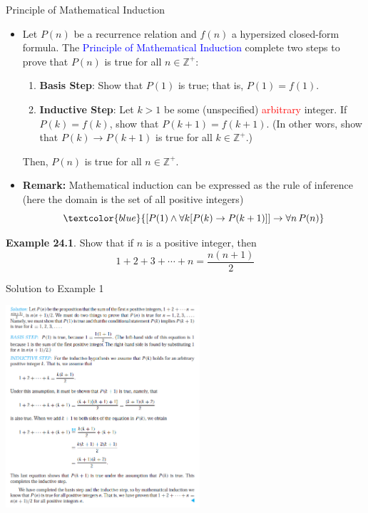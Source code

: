 \documentclass[aspectratio=169]{beamer}
\providecommand{\Blue}[1]{\textcolor{blue}{#1}}
\providecommand{\Red}[1]{\textcolor{red}{#1}}
\begin{document}
\begin{frame}[plain]{Principle of Mathematical Induction}
 \begin{itemize}
  \item Let $P(n)$ be a recurrence relation and $f(n)$ a hypersized closed-form formula. 
     The \Blue{Principle of Mathematical Induction} complete two steps to prove that $P(n)$
    is true for all $n\in\mathbb{Z}^+$: \pause 
   \begin{enumerate}
     \item {\bf Basis Step}: Show that $P(1)$ is true; that is, $P(1) = f(1)$.\pause 
     \item {\bf Inductive Step}: Let $k>1$ be some (unspecified) \Red{arbitrary}  integer.
        If $P(k) = f(k)$,  show that $P(k+1) = f(k+1)$.
        (In other wors, show that $P(k)\rightarrow P(k+1)$ is true for all $k\in \mathbb{Z}^+$.)\pause 
   \end{enumerate}
   Then, $P(n)$ is true for all $n\in \mathbb{Z}^+$.\pause 
    \item {\bf Remark:} Mathematical induction can be expressed as the rule of inference
   (here the domain is the set of all positive integers)
  \[ \Blue{ [P(1)\wedge \forall k [P(k)\rightarrow P(k+1)]] \rightarrow \forall n\, P(n) } \] 
 \end{itemize} 

\end{frame}

\begin{frame}[plain]{}

  {\bf Example 24.1}. Show that if $n$ is a positive integer, then
   \[ 1+2+3+ \cdots + n = \frac{n(n+1)}{2} \]
  
   \vspace{1.4in}

\end{frame}


\begin{frame}[plain]{Solution to Example 1}
 \begin{center}
  \includegraphics[height=7.5cm]{./img/lecture24-fig2.png}
 \end{center}

\end{frame}
\end{document}
